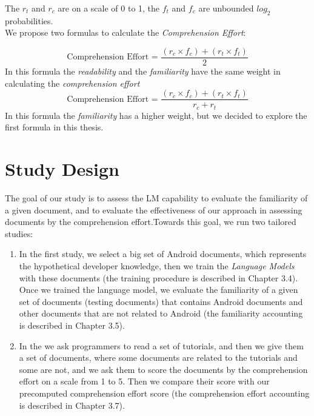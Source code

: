 \documentclass[12pt,mscthesis]{usiinfthesis}
\begin{document}
 The $r_{t}$  and $r_{c}$ are on a scale of 0 to 1,  the $f_{t}$  and $f_{c}$ are unbounded $log_{2}$ probabilities.\\
 We propose two formulas to calculate the \emph{Comprehension Effort}:

 \[\text{Comprehension Effort = }\frac{(r_{c}\times f_{c}) + (r_{t} \times f_{t})}{2} \]
 In this formula the \emph{readability} and the \emph{familiarity} have the same weight in calculating the \emph{comprehension effort}
 \[\text{Comprehension Effort = }\frac{(r_{c}\times f_{c}) + (r_{t} \times f_{t})}{r_c+r_t} \]
 In this formula the \emph{familiarity} has a higher weight, but we decided to explore the first formula in this thesis.
	
\chapter{Study Design}

	The goal of our study is to assess the LM capability to evaluate the familiarity of a given document, and to evaluate the effectiveness of our approach in assessing documents by the comprehension effort.Towards this goal, we run two tailored studies:
	\begin{enumerate} 
		\item In the first study, we select a big set of Android documents, which represents the hypothetical developer knowledge, then we train the \emph{Language Models} with these documents (the training procedure is described in Chapter 3.4). Once we trained the language model, we evaluate the familiarity of a given set of documents (testing documents) that contains Android documents and other documents that are not related to Android (the familiarity accounting is described in Chapter 3.5). 
		\item In the  we ask programmers to read a set of tutorials, and then we give them a set of documents, where some documents are related to the tutorials and some are not, and we ask them to score the documents by the comprehension effort on a scale from 1 to 5. Then we compare their score with our precomputed comprehension effort score (the comprehension effort accounting is described in Chapter 3.7).
	\end{enumerate}
\end{document}
